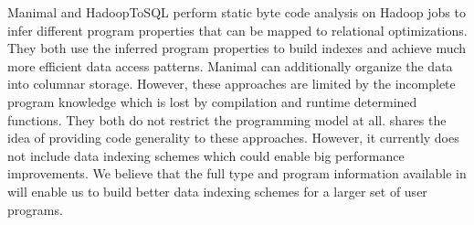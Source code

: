 Manimal \cite{jahani_automatic_2011} and HadoopToSQL \cite{iu_hadooptosql:_2010}
perform static byte code analysis on Hadoop jobs to infer different program
properties that can be mapped to relational optimizations. They both use the
inferred program properties to build indexes and achieve much more efficient
data access patterns. Manimal can additionally organize the data into columnar
storage. However, these approaches are limited by the incomplete program
knowledge which is lost by compilation and runtime determined functions. They both do not
restrict the programming model at all.
\tool shares the idea of providing code generality to these approaches. However,
it currently does not include data indexing schemes which could enable big
performance improvements. We believe that the full type and program information
available in \tool will enable us to build better data indexing schemes for a
larger set of user programs.
